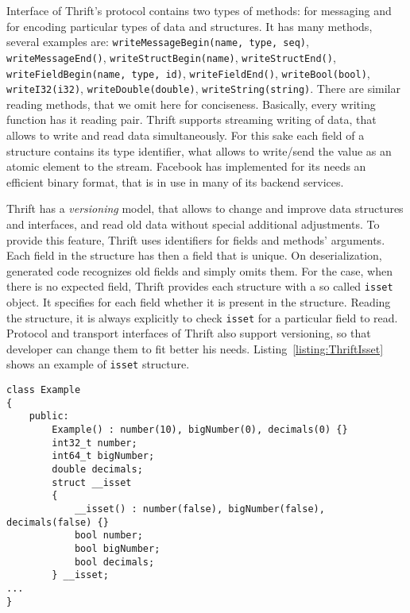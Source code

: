 Interface of Thrift's protocol contains two types of methods: for messaging and for encoding particular types of data and structures.
It has many methods, several examples are: \lstinline{writeMessageBegin(name, type, seq)}, \lstinline{writeMessageEnd()}, \lstinline{writeStructBegin(name)}, \lstinline{writeStructEnd()}, \lstinline{writeFieldBegin(name, type, id)}, \lstinline{writeFieldEnd()}, \lstinline{writeBool(bool)}, \lstinline{writeI32(i32)}, \lstinline{writeDouble(double)}, \lstinline{writeString(string)}.
There are similar reading methods, that we omit here for conciseness.
Basically, every writing function has it reading pair.
Thrift supports streaming writing of data, that allows to write and read data simultaneously.
For this sake each field of a structure contains its type identifier, what allows to write/send the value as an atomic element to the stream.
Facebook has implemented for its needs an efficient binary format, that is in use in many of its backend services.

Thrift has a \textit{versioning}  model, that allows to change and improve data structures and interfaces, and read old data without special additional adjustments.
To provide this feature, Thrift uses identifiers for fields and methods' arguments.
Each field in the structure has then a field that is unique.
On deserialization, generated code recognizes old fields and simply omits them.
For the case, when there is no expected field, Thrift provides each structure with a so called \lstinline{isset} object.
It specifies for each field whether it is present in the structure.
Reading the structure, it is always explicitly to check \lstinline{isset} for a particular field to read.
Protocol and transport interfaces of Thrift also support versioning, so that developer can change them to fit better his needs.
Listing~\ref{listing:ThriftIsset} shows an example of \lstinline{isset} structure.

\begin{lstlisting}[float=h, caption=Example of isset structure., label=listing:ThriftIsset]
class Example
{
	public:
		Example() :	number(10),	bigNumber(0), decimals(0) {}
		int32_t number;
		int64_t bigNumber;
		double decimals;
		struct __isset
		{
			__isset() :	number(false), bigNumber(false), decimals(false) {}
			bool number;
			bool bigNumber;
			bool decimals;
		} __isset;
...
}
\end{lstlisting}


